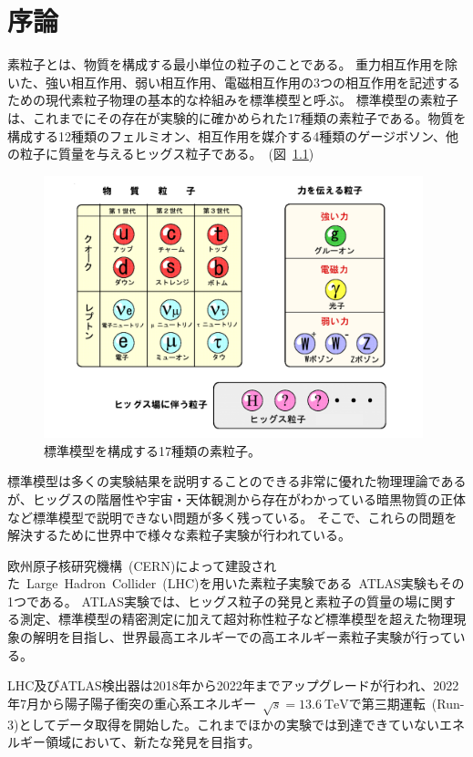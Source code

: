 \chapter{序論}
素粒子とは、物質を構成する最小単位の粒子のことである。
重力相互作用を除いた、強い相互作用、弱い相互作用、電磁相互作用の3つの相互作用を記述するための現代素粒子物理の基本的な枠組みを標準模型と呼ぶ。
標準模型の素粒子は、これまでにその存在が実験的に確かめられた17種類の素粒子である。物質を構成する12種類のフェルミオン、相互作用を媒介する4種類のゲージボソン、他の粒子に質量を与えるヒッグス粒子である。~(図~\ref{fig:1-1})

\begin{figure}[H]
  \centering
  \includegraphics[clip, width=11cm]{fig/1/standardModel.pdf}
  \caption{標準模型を構成する17種類の素粒子。\cite{article:ATLAS_japan}}
  \label{fig:1-1}
\end{figure}

\newpage

標準模型は多くの実験結果を説明することのできる非常に優れた物理理論であるが、ヒッグスの階層性や宇宙・天体観測から存在がわかっている暗黒物質の正体など標準模型で説明できない問題が多く残っている。
そこで、これらの問題を解決するために世界中で様々な素粒子実験が行われている。

欧州原子核研究機構~(CERN)\cite{article:CERN}によって建設された~Large~Hadron~Collider~(LHC)\cite{article:LHC}を用いた素粒子実験である~ATLAS実験\cite{article:ATLAS}もその1つである。
ATLAS実験では、ヒッグス粒子の発見と素粒子の質量の場に関する測定、標準模型の精密測定に加えて超対称性粒子など標準模型を超えた物理現象の解明を目指し、世界最高エネルギーでの高エネルギー素粒子実験が行っている。

LHC及びATLAS検出器は2018年から2022年までアップグレードが行われ、2022年7月から陽子陽子衝突の重心系エネルギー~$\sqrt{s}=\SI{13.6}{\TeV}$で第三期運転~(Run-3)としてデータ取得を開始した。これまでほかの実験では到達できていないエネルギー領域において、新たな発見を目指す。